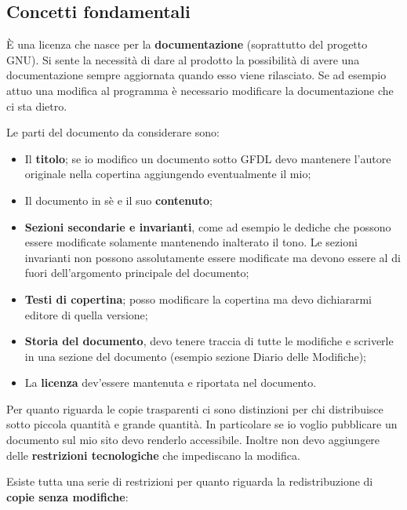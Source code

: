 \subsection{Concetti fondamentali}

È una licenza che nasce per la \textbf{documentazione} (soprattutto del progetto GNU). Si sente la necessità di dare al prodotto la possibilità di avere una documentazione sempre aggiornata quando esso viene rilasciato. Se ad esempio attuo una modifica al programma è necessario modificare la documentazione che ci sta dietro. 

Le parti del documento da considerare sono:

\begin{itemize}

\item Il \textbf{titolo}; se io modifico un documento sotto GFDL devo mantenere l'autore originale nella copertina aggiungendo eventualmente il mio;
\item Il documento in sè e il suo \textbf{contenuto};
\item \textbf{Sezioni secondarie e invarianti}, come ad esempio le dediche che possono essere modificate solamente mantenendo inalterato il tono. Le sezioni invarianti non possono assolutamente essere modificate ma devono essere al di fuori dell'argomento principale del documento;
\item \textbf{Testi di copertina}; posso modificare la copertina ma devo dichiararmi editore di quella versione;
\item \textbf{Storia del documento}, devo tenere traccia di tutte le modifiche e scriverle in una sezione del documento (esempio sezione Diario delle Modifiche);
\item La \textbf{licenza} dev'essere mantenuta e riportata nel documento.

\end{itemize}

Per quanto riguarda le copie trasparenti ci sono distinzioni per chi distribuisce sotto piccola quantità e grande quantità. In particolare se io voglio pubblicare un documento sul mio sito devo renderlo accessibile. Inoltre non devo aggiungere delle \textbf{restrizioni tecnologiche} che impediscano la modifica. 

Esiste tutta una serie di restrizioni per quanto riguarda la redistribuzione di \textbf{copie senza modifiche}:


